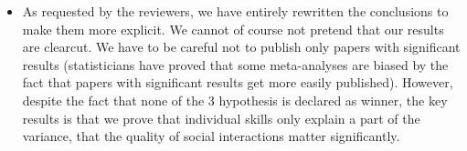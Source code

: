 \documentclass{article}
\begin{document}
\begin{itemize}
    \item As requested by the reviewers, we have entirely rewritten  the
        conclusions to make them more explicit.  We cannot of course not pretend
        that our results are clearcut. We have to be careful not to publish only
        papers with significant results (statisticians have proved that some
        meta-analyses are biased by the fact that papers with significant results
        get more easily published). However, despite the fact that none of the 3
        hypothesis is declared as winner, the key results is that we prove that
        individual skills only explain a part of the variance, that the quality of
        social interactions matter significantly.

\end{itemize}
\end{document}
